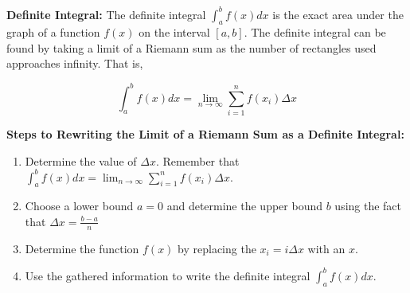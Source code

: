 \noindent \textbf{Definite Integral:} The definite integral $\int_a^b f(x)dx$ is
the exact area under the graph of a function $f(x)$ on the interval $[a, b]$.
The definite integral can be found by taking a limit of a Riemann sum as the 
number of rectangles used approaches infinity. That is,

\begin{equation*}
  \int_a^b f(x)dx = \lim_{n \to \infty} \sum_{i=1}^{n} f(x_i) \Delta x
\end{equation*}

\noindent \textbf{Steps to Rewriting the Limit of a Riemann Sum as a Definite 
                  Integral:} 
\begin{enumerate}
  \item  Determine the value of $\Delta x$. Remember that $ \int_a^b f(x)dx = 
        \lim_{n \to \infty} \sum_{i=1}^{n} f(x_i) \Delta x.$
  \item  Choose a lower bound $a=0$ and determine the upper bound $b$ using the 
         fact that $\Delta x = \frac{b-a}{n}$
  \item Determine the function $f(x)$ by replacing the $x_i = i \Delta x$ with 
        an $x$.
  \item Use the gathered information to write the definite integral 
        $\int_a^b f(x)dx$.
\end{enumerate}

